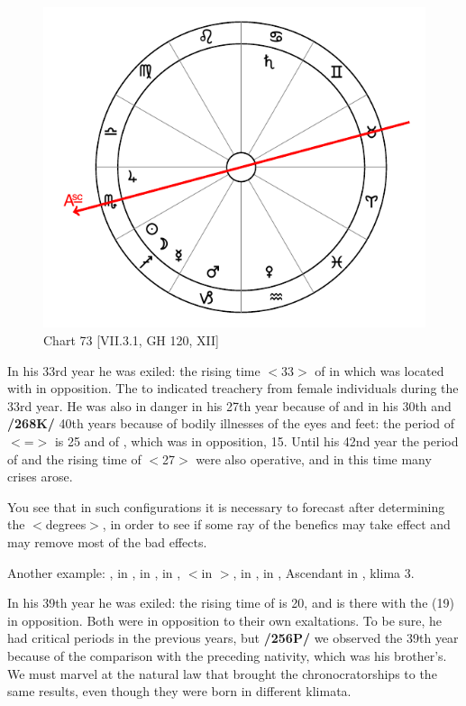 \begin{figure}
\centering
\vspace{-20pt}
\includegraphics[width=.68\textwidth]{charts/7_3_1}
\caption{Chart 73 [VII.3.1, GH 120, XII]}
\label{fig:chart73}
\end{figure}

In his 33rd year he was exiled: the rising time $<$33$>$ of \Cancer\xspace in which \Saturn\xspace was located with \Mars\xspace in opposition. The \Moon\xspace \Sextile\xspace to
\Venus\xspace indicated treachery from female individuals during the 33rd year. He was also in danger in his 27th year because of \Capricorn\xspace and in his 30th and \textbf{/268K/} 40th years because of bodily illnesses of the eyes and feet: the period of \Cancer $<$=\Moon$>$ is 25 and of \Mars, which was in opposition, 15. Until his 42nd year the period of \Mars\xspace and the rising time of \Capricorn\xspace $<$27$>$ were also operative, and in this time many crises arose. 

You see that in such configurations it is necessary to forecast after determining the $<$degrees$>$, in order to see if some ray of the benefics may take effect and may remove most of the bad effects.

\newpage
Another example: \Sun, \Venus\xspace in \Libra, \Saturn\xspace in \Aries, \Jupiter\xspace in \Taurus, \Mars\xspace $<$in \Libra$>$, \Mercury\xspace in \Virgo, \Moon\xspace in \Sagittarius, Ascendant in \Libra, klima 3. 

In his 39th year he was exiled: the rising time of \Aries\xspace is 20, and \Saturn\xspace is there with the \Sun\xspace (19) in opposition. Both were in opposition to their own exaltations. To be sure, he had critical periods in the previous years, but \textbf{/256P/} we observed the 39th year because of the comparison with the preceding nativity, which was his brother’s. We must marvel at the natural law that brought the chronocratorships to the same results, even though they were born in different klimata.

